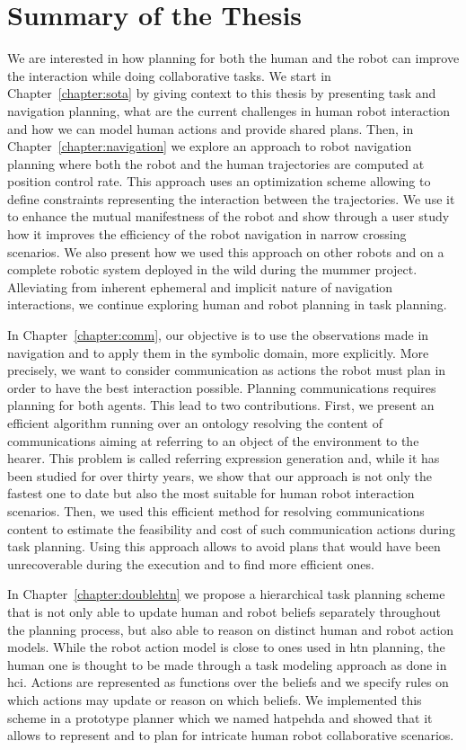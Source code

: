 \documentclass[a4paper,11pt,twoside]{StyleThese}
\begin{document}
\section*{Summary of the Thesis}
We are interested in how planning for both the human and the robot can improve the interaction while doing collaborative tasks. We start in Chapter~\ref{chapter:sota} by giving context to this thesis by presenting task and navigation planning, what are the current challenges in human robot interaction and how we can model human actions and provide shared plans. Then, in Chapter~\ref{chapter:navigation} we explore an approach to robot navigation planning where both the robot and the human trajectories are computed at position control rate. This approach uses an optimization scheme allowing to define constraints representing the interaction between the trajectories. We use it to enhance the mutual manifestness of the robot and show through a user study how it improves the efficiency of the robot navigation in narrow crossing scenarios. We also present how we used this approach on other robots and on a complete robotic system deployed in the wild during the \acrfull{mummer} project. Alleviating from inherent ephemeral and implicit nature of navigation interactions, we continue exploring human and robot planning in task planning.

In Chapter~\ref{chapter:comm}, our objective is to use the observations made in navigation and to apply them in the symbolic domain, more explicitly. More precisely, we want to consider communication as actions the robot must plan in order to have the best interaction possible. Planning communications requires planning for both agents. This lead to two contributions. First, we present an efficient algorithm running over an ontology resolving the content of communications aiming at referring to an object of the environment to the hearer. This problem is called referring expression generation and, while it has been studied for over thirty years, we show that our approach is not only the fastest one to date but also the most suitable for human robot interaction scenarios. Then, we used this efficient method for resolving communications content to estimate the feasibility and cost of such communication actions during task planning. Using this approach allows to avoid plans that would have been unrecoverable during the execution and to find more efficient ones.

In Chapter~\ref{chapter:doublehtn} we propose a hierarchical task planning scheme that is not only able to update human and robot beliefs separately throughout the planning process, but also able to reason on distinct human and robot action models. While the robot action model is close to ones used in \acrlong{htn} planning, the human one is thought to be made through a task modeling approach as done in \acrlong{hci}. Actions are represented as functions over the beliefs and we specify rules on which actions may update or reason on which beliefs. We implemented this scheme in a prototype planner which we named \acrfull{hatpehda} and showed that it allows to represent and to plan for intricate human robot collaborative scenarios. 
\end{document}
